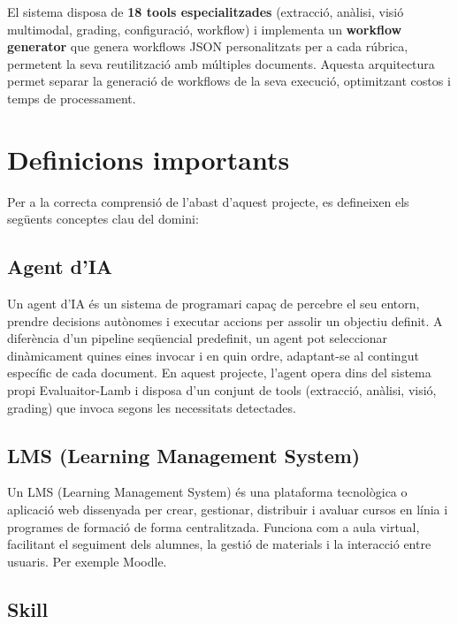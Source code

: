 \documentclass[12pt,a4paper,twoside]{report}
\begin{document}
El sistema disposa de \textbf{18 tools especialitzades} (extracci\'o, an\`alisi, visi\'o multimodal, grading, configuraci\'o, workflow) i implementa un \textbf{workflow generator} que genera workflows JSON personalitzats per a cada r\'ubrica, permetent la seva reutilitzaci\'o amb m\'ultiples documents. Aquesta arquitectura permet separar la generaci\'o de workflows de la seva execuci\'o, optimitzant costos i temps de processament.

\section{Definicions importants}
\label{sec:definicions}

Per a la correcta comprensi\'o de l'abast d'aquest projecte, es defineixen els seg\"uents conceptes clau del domini:

\subsection{Agent d'IA}
\label{subsec:agent-ia}

Un agent d'IA \'es un sistema de programari capa\c{c} de percebre el seu entorn, prendre decisions aut\`onomes i executar accions per assolir un objectiu definit. A difer\`encia d'un pipeline seq\"uencial predefinit, un agent pot seleccionar din\`amicament quines eines invocar i en quin ordre, adaptant-se al contingut espec\'ific de cada document. En aquest projecte, l'agent opera dins del sistema propi Evaluaitor-Lamb i disposa d'un conjunt de tools (extracci\'o, an\`alisi, visi\'o, grading) que invoca segons les necessitats detectades.

\subsection{LMS (Learning Management System)}
\label{subsec:lms}

Un LMS (Learning Management System) \'es una plataforma tecnol\`ogica o aplicaci\'o web dissenyada per crear, gestionar, distribuir i avaluar cursos en l\'inia i programes de formaci\'o de forma centralitzada. Funciona com a aula virtual, facilitant el seguiment dels alumnes, la gesti\'o de materials i la interacci\'o entre usuaris. Per exemple Moodle.

\subsection{Skill}
\label{subsec:skill}
\end{document}
